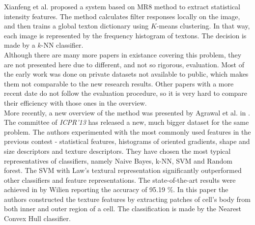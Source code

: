 Xianfeng et al. proposed a system based on MR8 method \cite{Varma2005} to extract statistical intensity features. The method calculates filter responses locally on the image, and then trains a global texton dictionary using $K$-means clustering. In that way, each image is represented by the frequency histogram of textons. The decision is made by a $k$-NN classifier. \\

Although there are many more papers in existance covering this problem, they are not presented here due to different, and not so rigorous, evaluation. Most of the early work was done on private datasets not available to public, which makes them not comparable to the new research results. Other papers with  a more recent date do not follow the evaluation procedure, so it is very hard to compare their efficiency with those ones in the overview. \\

More recently, a new overview of the method was presented by Agrawal et al. in \cite{Agrawal2013}. The committee of \textit{ICPR'13} has released a new, much bigger dataset for the same problem. The authors experimented with the most commonly used features in the previous contest - statistical features, histograms of oriented gradients, shape and size descriptors and texture descriptors. They have chosen the most typical representatives of classifiers, namely Naive Bayes, k-NN, SVM and Random forest. The SVM with Law's textural representation significantly  outperformed other classifiers and feature representations. The state-of-the-art results were achieved in \cite{Wiliem} by Wilien reporting the accuracy of 95.19 \%. In this paper the authors constructed the texture features by extracting patches of cell's body from both inner and outer region of a cell. The classification is made by the Nearest Convex Hull classifier.



